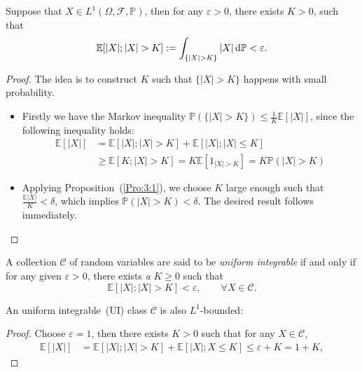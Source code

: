 \begin{corollary}\label{Cor:3:1}
Suppose that $X\in L^1(\Omega,\mathcal{F},\mathbb{P})$,
then for any $\varepsilon>0$, there exists $K>0$,
such that 
\[
\mathbb{E}[|X|;|X|>K]:=\int_{\{|X|>K\}}|X|\diff\mathbb{P}<\varepsilon.
\]
\end{corollary}
\begin{proof}
The idea is to construct $K$ such that $\{|X|>K\}$ happens with small probability.
\begin{itemize}
\item
Firstly we have the Markov inequality $\mathbb{P}(\{|X|>K\})\le \frac{1}{K}\mathbb{E}[|X|]$, since the following inequality holds:
\begin{align*}
\mathbb{E}[|X|]&=\mathbb{E}[|X|;|X|>K]+\mathbb{E}[|X|;|X|\le K]\\
&\ge \mathbb{E}[K;|X|>K]
=K\mathbb{E}[1_{|X|>K}]=K\mathbb{P}(|X|>K)
\end{align*}
\item
Applying Proposition~(\ref{Pro:3:1}), we choose $K$ large enough such that $\frac{\mathbb{E}|X|}{K}<\delta$, which implies $\mathbb{P}(|X|>K)<\delta$.
The desired result follows immediately.
\end{itemize}
\end{proof}

\begin{definition}
A collection $\mathcal{C}$ of random variables are said to be \emph{uniform integrable} if and only if for any given $\varepsilon>0$, there exists \emph{a} $K\ge0$ such that
\[
\mathbb{E}[|X|;|X|>K]<\varepsilon,\qquad
\forall X\in\mathcal{C}.
\]
\end{definition}

\begin{remark}
An uniform integrable~(UI) class $\mathcal{C}$ is also $L^1$-bounded:
\begin{proof}
Choose $\varepsilon=1$, then there exists $K>0$ such that for any $X\in\mathcal{C}$,
\begin{align*}
\mathbb{E}[|X|]&=\mathbb{E}[|X|;|X|>K]+\mathbb{E}[|X|;X\le K]\le\varepsilon+K=1+K,
\end{align*}
\end{proof}
\end{remark}

